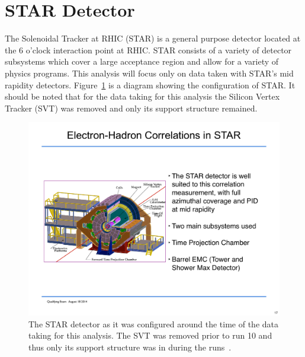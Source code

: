 \section{STAR Detector}

The Solenoidal Tracker at RHIC (STAR) is a general purpose detector located at the 6 o'clock interaction point at RHIC. STAR consists of a variety of detector subsystems which cover a large acceptance region and allow for a variety of physics programs. This analysis will focus only on data taken with STAR's mid rapidity detectors. Figure~\ref{fig:STAR} is a diagram showing the configuration of STAR. It should be noted that for the data taking for this analysis the Silicon Vertex Tracker (SVT) was removed and only its support structure remained.

\begin{figure}[htbp]
\begin{center}
\includegraphics[scale=0.7]{Plots/Detector/STAR_Detector.pdf}
\end{center}
\caption[STAR Detector]{The STAR detector as it was configured around the time of the data taking for this analysis. The SVT was removed prior to run 10 and thus only its support structure was in during the runs~\cite{STARweb}.}
\label{fig:STAR}
\end{figure}

